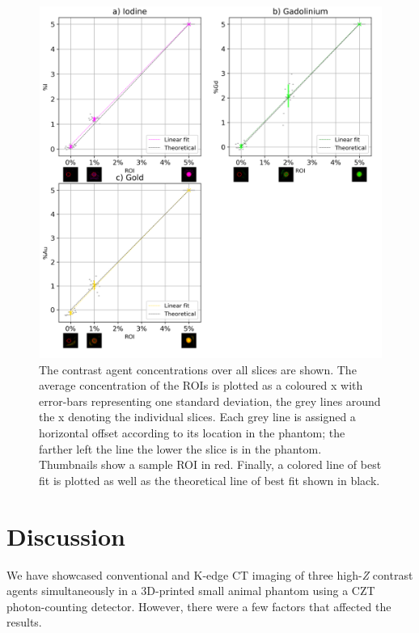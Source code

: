 \documentclass[journal, a4paper]{IEEEtran}
\begin{document}
\begin{figure}[!h]

\includegraphics[width=\linewidth]{Figures/concentrations.png}

\caption{The contrast agent concentrations over all slices are shown. The average concentration of the ROIs is plotted as a coloured x with error-bars representing one standard deviation, the grey lines around the x denoting the individual slices. Each grey line is assigned a horizontal offset according to its location in the phantom; the farther left the line the lower the slice is in the phantom. Thumbnails show a sample ROI in red. Finally, a colored line of best fit is plotted as well as the theoretical line of best fit shown in black.  }
\label{concentrations}

\end{figure}

\section{Discussion}
We have showcased conventional and K-edge CT imaging of three high-\textit{Z} contrast agents simultaneously in a 3D-printed small animal phantom using a CZT photon-counting detector. However, there were a few factors that affected the results. 
\end{document}
